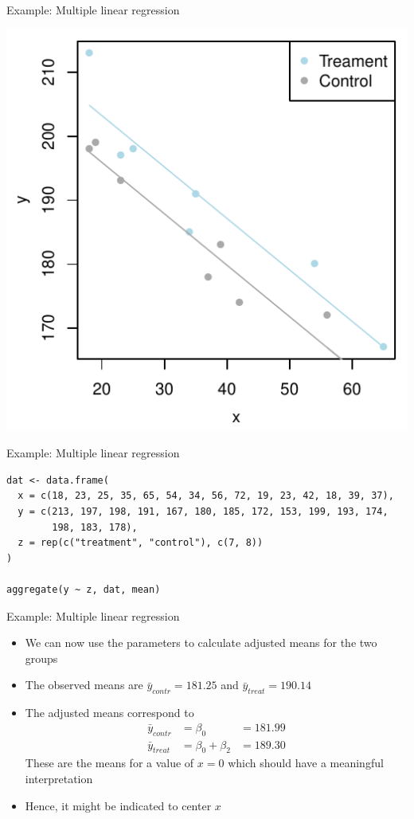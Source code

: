 \documentclass[aspectratio=169]{beamer}
\begin{document}
\begin{frame}[fragile]{Example: Multiple linear regression}
\begin{center}
\includegraphics[scale=.8]{../figures/ancova2}
\end{center}
\end{frame}

\begin{frame}[fragile]{Example: Multiple linear regression}
\begin{lstlisting}
dat <- data.frame(
  x = c(18, 23, 25, 35, 65, 54, 34, 56, 72, 19, 23, 42, 18, 39, 37),
  y = c(213, 197, 198, 191, 167, 180, 185, 172, 153, 199, 193, 174,
        198, 183, 178),
  z = rep(c("treatment", "control"), c(7, 8))
)

aggregate(y ~ z, dat, mean)
\end{lstlisting}
\end{frame}

\begin{frame}[fragile]{Example: Multiple linear regression}
  \begin{itemize}
    \item We can now use the parameters to calculate adjusted means for the
      two groups
    \item The observed means are $\bar y_{contr} = 181.25$ and
      $\bar y_{treat} = 190.14$
    \item The adjusted means correspond to
\begin{align*}
  \bar y_{contr} & = \beta_0 & = 181.99\\
  \bar y_{treat} & = \beta_0 + \beta_2 & = 189.30
\end{align*}
These are the means for a value of $x = 0$ which should have a meaningful
interpretation
\item Hence, it might be indicated to center $x$
  \end{itemize}
\end{frame}
\end{document}
